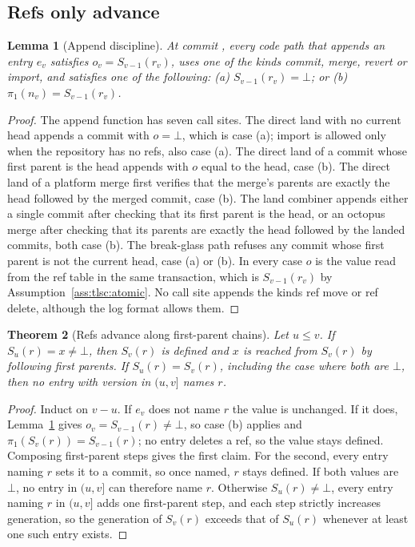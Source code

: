 \documentclass[11pt,letterpaper]{article}
\newtheorem{theorem}{Theorem}[section]
\newtheorem{lemma}[theorem]{Lemma}
\theoremstyle{definition}
\theoremstyle{remark}
\newcommand{\Snap}[1]{S_{#1}}
\newcommand{\fp}{\pi_1}
\begin{document}
\subsection{Refs only advance}

\begin{lemma}[Append discipline]
\label{lem:tlsc:append}
At commit , every code path that appends an entry $e_v$ satisfies $o_v=\Snap{v-1}(r_v)$, uses one of the kinds commit, merge, revert or import, and satisfies one of the following: (a) $\Snap{v-1}(r_v)=\bot$; or (b) $\fp(n_v)=\Snap{v-1}(r_v)$.
\end{lemma}

\begin{proof}
The append function has seven call sites. The direct land with no current head appends a commit with $o=\bot$, which is case (a); import is allowed only when the repository has no refs, also case (a). The direct land of a commit whose first parent is the head appends with $o$ equal to the head, case (b). The direct land of a platform merge first verifies that the merge's parents are exactly the head followed by the merged commit, case (b). The land combiner appends either a single commit after checking that its first parent is the head, or an octopus merge after checking that its parents are exactly the head followed by the landed commits, both case (b). The break-glass path refuses any commit whose first parent is not the current head, case (a) or (b). In every case $o$ is the value read from the ref table in the same transaction, which is $\Snap{v-1}(r_v)$ by Assumption~\ref{ass:tlsc:atomic}. No call site appends the kinds ref move or ref delete, although the log format allows them.
\end{proof}

\begin{theorem}[Refs advance along first-parent chains]
\label{thm:tlsc:forward}
Let $u\leq v$. If $\Snap{u}(r)=x\neq\bot$, then $\Snap{v}(r)$ is defined and $x$ is reached from $\Snap{v}(r)$ by following first parents. If $\Snap{u}(r)=\Snap{v}(r)$, including the case where both are $\bot$, then no entry with version in $(u,v]$ names $r$.
\end{theorem}

\begin{proof}
Induct on $v-u$. If $e_{v}$ does not name $r$ the value is unchanged. If it does, Lemma~\ref{lem:tlsc:append} gives $o_v=\Snap{v-1}(r)\neq\bot$, so case (b) applies and $\fp(\Snap{v}(r))=\Snap{v-1}(r)$; no entry deletes a ref, so the value stays defined. Composing first-parent steps gives the first claim. For the second, every entry naming $r$ sets it to a commit, so once named, $r$ stays defined. If both values are $\bot$, no entry in $(u,v]$ can therefore name $r$. Otherwise $\Snap{u}(r)\neq\bot$, every entry naming $r$ in $(u,v]$ adds one first-parent step, and each step strictly increases generation, so the generation of $\Snap{v}(r)$ exceeds that of $\Snap{u}(r)$ whenever at least one such entry exists.
\end{proof}
\end{document}
